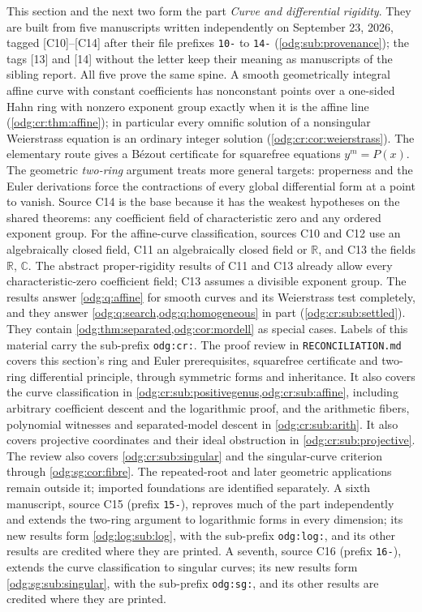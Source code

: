 \documentclass[11pt,oneside]{article}
\numberwithin{equation}{section}
\theoremstyle{definition}
\theoremstyle{remark}
\newcommand{\R}{\mathbb R}
\newcommand{\C}{\mathbb C}
\newcommand{\src}[1]{\textup{\textsf{\small[#1]}}}
\newcommand{\fn}[1]{\nolinkurl{#1}}
\begin{document}
This section and the next two form the part \emph{Curve and differential
rigidity}. They are built from five manuscripts written independently on
September 23, 2026, tagged \src{C10}--\src{C14} after their file prefixes
\fn{10-} to \fn{14-} (\cref{odg:sub:provenance}); the tags \src{13} and
\src{14} without the letter keep their meaning as manuscripts of the sibling
report. All five prove the same spine. A smooth geometrically integral affine
curve with constant coefficients has nonconstant points over a one-sided Hahn
ring with nonzero exponent group exactly when it is the affine line
(\cref{odg:cr:thm:affine}); in particular every omnific solution of a
nonsingular Weierstrass equation is an ordinary integer solution
(\cref{odg:cr:cor:weierstrass}). The elementary route gives a B\'ezout
certificate for squarefree equations $y^m=P(x)$. The geometric
\emph{two-ring} argument treats more general targets: properness and the
Euler derivations force the contractions of every global differential
form at a point to vanish. Source
C14 is the base because it has the weakest hypotheses on the shared theorems:
any coefficient field of characteristic zero and any ordered exponent group.
For the affine-curve classification, sources C10 and C12 use an
algebraically closed field, C11 an algebraically closed field or $\R$,
and C13 the fields $\R$, $\C$. The abstract proper-rigidity results of
C11 and C13 already allow every characteristic-zero coefficient field;
C13 assumes a divisible exponent group. The results answer \cref{odg:q:affine} for
smooth curves and its Weierstrass test completely, and they answer
\cref{odg:q:search,odg:q:homogeneous} in part (\cref{odg:cr:sub:settled}).
They contain \cref{odg:thm:separated,odg:cor:mordell} as special cases.
Labels of this material carry the sub-prefix \fn{odg:cr:}. The proof review in
\fn{RECONCILIATION.md} covers this section's ring and Euler prerequisites,
squarefree certificate and two-ring differential principle, through symmetric
forms and inheritance. It also covers the curve classification in
\cref{odg:cr:sub:positivegenus,odg:cr:sub:affine}, including arbitrary coefficient
descent and the logarithmic proof, and the arithmetic fibers, polynomial witnesses
and separated-model descent in \cref{odg:cr:sub:arith}. It also covers projective
coordinates and their ideal obstruction in \cref{odg:cr:sub:projective}.
The review also covers \cref{odg:cr:sub:singular} and the singular-curve
criterion through \cref{odg:sg:cor:fibre}. The repeated-root and later
geometric applications remain outside it; imported foundations are identified
separately.
A sixth manuscript, source C15
(prefix \fn{15-}), reproves much of the part independently and extends the two-ring
argument to logarithmic forms in every dimension; its new results form
\cref{odg:log:sub:log}, with the sub-prefix \fn{odg:log:}, and its other results are
credited where they are printed. A seventh, source C16 (prefix \fn{16-}), extends the curve
classification to singular curves; its new results form \cref{odg:sg:sub:singular}, with
the sub-prefix \fn{odg:sg:}, and its other results are credited where they are printed.
\end{document}
